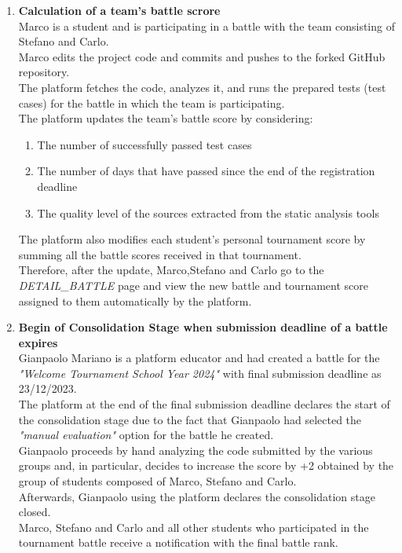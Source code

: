 \begin{enumerate}
	\item \textbf{Calculation of a team's battle scrore}\\
	      Marco is a student and is participating in a battle with the team consisting of Stefano and Carlo.\\
	      Marco edits the project code and commits and pushes to the forked GitHub repository. \\
	      The platform fetches the code, analyzes it, and runs the prepared tests (test cases) for the battle in which the team is participating.\\
	      The platform updates the team's battle score by considering:
	      \begin{enumerate}
		      \item The number of successfully passed test cases
		      \item The number of days that have passed since the end of the registration deadline
		      \item The quality level of the sources extracted from the static analysis tools
	      \end{enumerate}
	      The platform also modifies each student's personal tournament score by summing all the battle scores received in that tournament.\\
	      Therefore, after the update, Marco,Stefano and Carlo go to the \emph{DETAIL\_BATTLE} page and view the new battle and tournament score assigned to them automatically by the platform.\\





	\item \textbf{Begin of Consolidation Stage when submission deadline of a battle expires}\\
	      Gianpaolo Mariano is a platform educator and had created a battle for the \emph{"Welcome Tournament School Year 2024"} with final submission deadline as 23/12/2023.\\
	      The platform at the end of the final submission deadline declares the start of the consolidation stage due to the fact that Gianpaolo had selected the \emph{"manual evaluation"} option for the battle he created.\\
	      Gianpaolo proceeds by hand analyzing the code submitted by the various groups and, in particular, decides to increase the score by +2 obtained by the group of students composed of Marco, Stefano and Carlo.\\
	      Afterwards, Gianpaolo using the platform declares the consolidation stage closed.\\
	      Marco, Stefano and Carlo and all other students who participated in the tournament battle receive a notification with the final battle rank.



\end{enumerate}
